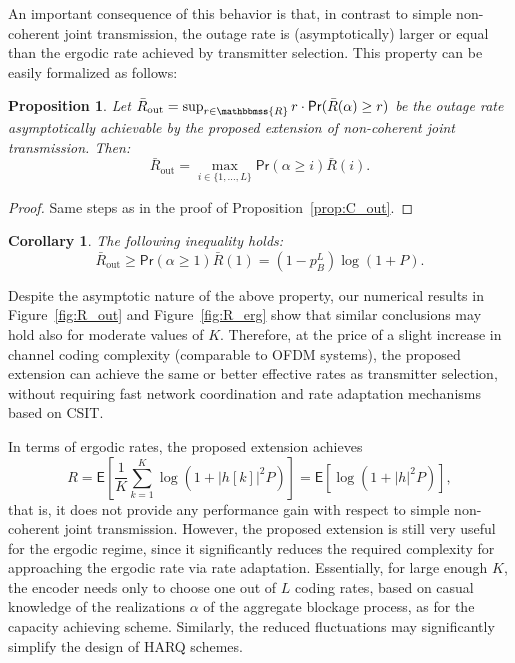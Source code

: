 \documentclass[10pt,journal,a4paper]{IEEEtran}
\newcommand{\E}{\mathsf{E}}		%
\renewcommand{\P}{\mathsf{Pr}} 			%
\newcommand{\stdset}[1]{\mathbbmss{#1}}	%
\newtheorem{proposition}{Proposition}
\newtheorem{corollary}{Corollary}
\begin{document}
An important consequence of this behavior is that, in contrast to simple non-coherent joint transmission, the outage rate is (asymptotically) larger or equal than the ergodic rate achieved by transmitter selection. This property can be easily formalized as follows:
\begin{proposition}
Let $\bar{R}_{\mathrm{out}}= \sup_{r\in \stdset{R}}r\cdot\P(\bar{R}(\alpha)\geq r)$ be the outage rate asymptotically achievable by the proposed extension of non-coherent joint transmission. Then:
\begin{equation*}
\bar{R}_{\mathrm{out}} = \max_{i\in\{1,\ldots,L\}} \P(\alpha \geq i) \bar{R}(i).
\end{equation*}
\end{proposition}
\begin{proof} 
Same steps as in the proof of Proposition~\ref{prop:C_out}.
\end{proof}

\begin{corollary}
The following inequality holds:
\begin{equation*}
\bar{R}_{\mathrm{out}} \geq \P(\alpha \geq 1) \bar{R}(1) = (1-p_B^L)\log(1+P). 
\end{equation*}
\end{corollary}
Despite the asymptotic nature of the above property, our numerical results in Figure~\ref{fig:R_out} and Figure~\ref{fig:R_erg} show that similar conclusions may hold also for moderate values of $K$. Therefore, at the price of a slight increase in channel coding complexity (comparable to OFDM systems), the proposed extension can achieve the same or better effective rates as transmitter selection, without requiring fast network coordination and rate adaptation mechanisms based on CSIT. 

In terms of ergodic rates, the proposed extension achieves
\begin{equation*}
R = \E\left[\dfrac{1}{K}\sum_{k=1}^K\log(1+|h[k]|^2P)\right] = \E[\log(1+|h|^2P)],
\end{equation*}
that is, it does not provide any performance gain with respect to simple non-coherent joint transmission. However, the proposed extension is still very useful for the ergodic regime, since it significantly reduces the required complexity for approaching the ergodic rate via rate adaptation. Essentially, for large enough $K$, the encoder needs only to choose one out of $L$ coding rates, based on casual knowledge of the realizations $\alpha$ of the aggregate blockage process, as for the capacity achieving scheme. Similarly, the reduced fluctuations may significantly simplify the design of HARQ schemes. 
\end{document}
